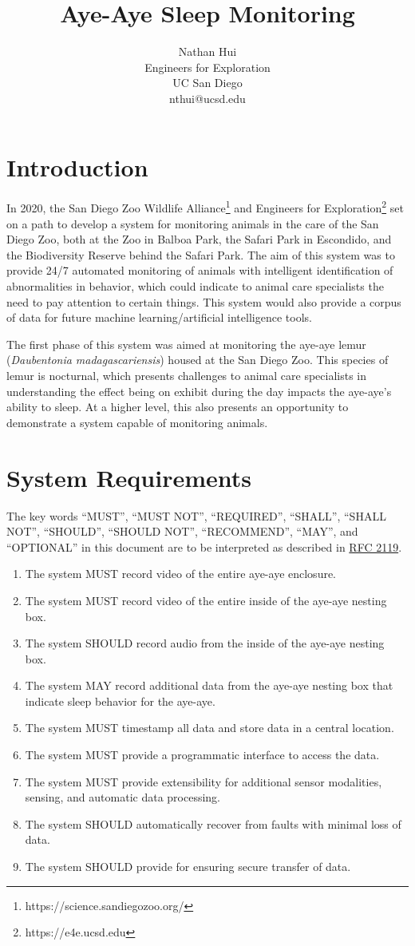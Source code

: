 \documentclass{article}
\title{Aye-Aye Sleep Monitoring}
\author{Nathan Hui\\Engineers for Exploration\\UC San Diego\\nthui@ucsd.edu}
\begin{document}
\maketitle
\section{Introduction}
In 2020, the San Diego Zoo Wildlife Alliance\footnote{https://science.sandiegozoo.org/} and Engineers for Exploration\footnote{https://e4e.ucsd.edu} set on a path to develop a system for monitoring animals in the care of the San Diego Zoo, both at the Zoo in Balboa Park, the Safari Park in Escondido, and the Biodiversity Reserve behind the Safari Park.  The aim of this system was to provide 24/7 automated monitoring of animals with intelligent identification of abnormalities in behavior, which could indicate to animal care specialists the need to pay attention to certain things.  This system would also provide a corpus of data for future machine learning/artificial intelligence tools.

The first phase of this system was aimed at monitoring the aye-aye lemur (\textit{Daubentonia madagascariensis}) housed at the San Diego Zoo.  This species of lemur is nocturnal, which presents challenges to animal care specialists in understanding the effect being on exhibit during the day impacts the aye-aye's ability to sleep.  At a higher level, this also presents an opportunity to demonstrate a system capable of monitoring animals.
\section{System Requirements}
The key words ``MUST'', ``MUST NOT'', ``REQUIRED'', ``SHALL'', ``SHALL NOT'', ``SHOULD'', ``SHOULD NOT'', ``RECOMMEND'', ``MAY'', and ``OPTIONAL'' in this document are to be interpreted as described in \href{https://datatracker.ietf.org/doc/html/rfc2119}{RFC 2119}.

\begin{enumerate}
    \item The system MUST record video of the entire aye-aye enclosure.
    \item The system MUST record video of the entire inside of the aye-aye nesting box.
    \item The system SHOULD record audio from the inside of the aye-aye nesting box.
    \item The system MAY record additional data from the aye-aye nesting box that indicate sleep behavior for the aye-aye.
    \item The system MUST timestamp all data and store data in a central location.
    \item The system MUST provide a programmatic interface to access the data.
    \item The system MUST provide extensibility for additional sensor modalities, sensing, and automatic data processing.
    \item The system SHOULD automatically recover from faults with minimal loss of data.
    \item The system SHOULD provide for ensuring secure transfer of data.
\end{enumerate}
\end{document}
